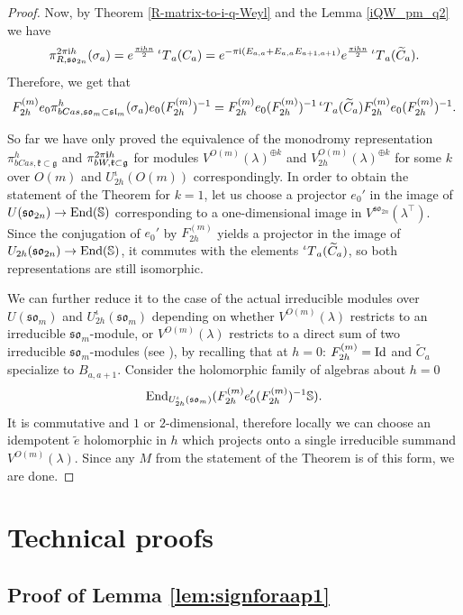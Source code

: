 \documentclass[10pt]{amsart}
\numberwithin{equation}{section}
\theoremstyle{definition}
\newcommand{\End}{{\rm End}}
\newcommand{\slm}{\mathfrak{sl}_{m}}
\newcommand{\son}[1][2n]{\mathfrak{so}_{#1}}
\newcommand{\som}[1][m]{\mathfrak{so}_{#1}}
\newcommand{\iQW}{\prescript{\iota}{}{T}}
\newcommand{\g}{\mathfrak{g}}
\newcommand{\kompact}{\mathfrak{k}}
\begin{document}
\begin{proof}
    Now, by Theorem \ref{R-matrix-to-i-q-Weyl} and the Lemma \ref{iQW_pm_q2} we have
    \[
    \pi^{2\pi {\rm i} h}_{R,\son}(\sigma_a)=e^{\frac{\pi{\rm i}hn}{2}}\iQW_a(C_a)=e^{-\pi {\rm i}(E_{a,a}+E_{a,a}E_{a+1,a+1})}e^{\frac{\pi{\rm i}hn}{2}}\iQW_a(\widetilde{C}_a).
    \]
    Therefore, we get that
    \[
    F^{(m)}_{2h}e_0\pi^h_{bCas, \som \subset \slm}(\sigma_a) e_0 (F^{(m)}_{2h})^{-1} = F^{(m)}_{2h}e_0(F^{(m)}_{2h})^{-1} \iQW_a(\widetilde{C}_a) F^{(m)}_{2h}e_0 (F^{(m)}_{2h})^{-1}.
    \]

    So far we have only proved the equivalence of the monodromy representation $\pi^h_{bCas,\kompact\subset \g}$ and $ \pi_{bW, \kompact \subset \g}^{2\pi {\bf i}h}$ for modules $V^{O(m)}(\lambda)^{\oplus k}$ and $V^{O(m)}_{2h}(\lambda)^{\oplus k}$ for some $k$ over $O(m)$ and $U^{\iota}_{2h}(O(m))$ correspondingly. In order to obtain the statement of the Theorem for $k=1$, let us choose a projector $e_0'$ in the image of $U(\son)\rightarrow \End(\mathbb{S})$ corresponding to a one-dimensional image in $V^{\son}(\lambda^{\top})$. Since the conjugation of $e_0'$ by $F^{(m)}_{2h}$ yields a projector in the image of $U_{2h}(\son)\rightarrow \End(\mathbb{S})$, it commutes with the elements $\iQW_a(\widetilde{C}_a)$, so both representations are still isomorphic.
    
    We can further reduce it to the case of the actual irreducible modules over $U(\som)$ and $U_{2h}^{\iota}(\som)$ depending on whether $V^{O(m)}(\lambda)$ restricts to an irreducible $\som$-module, or $V^{O(m)}(\lambda)$ restricts to a direct sum of two irreducible $\som$-modules (see \cite[Proposition 10.3.]{MR4983792}), by recalling that at $h=0$: $F^{(m)}_{2h}={\rm Id}$ and $\widetilde{C}_a$ specialize to $B_{a,a+1}$. Consider the holomorphic family of algebras about $h=0$
    \[
    \End_{U^{\iota}_{2h}(\som)}(F^{(m)}_{2h}e_0'(F^{(m)}_{2h})^{-1}\mathbb{S}).
    \]
    It is commutative and $1$ or $2$-dimensional, therefore locally we can choose an idempotent $\widetilde{e}$ holomorphic in $h$ which projects onto a single irreducible summand $V^{O(m)}(\lambda)$. Since any $M$ from the statement of the Theorem is of this form, we are done.
\end{proof}

\appendix

\section{Technical proofs}

\subsection{Proof of Lemma \ref{lem:signforaap1}}\label{proof3}
\end{document}
